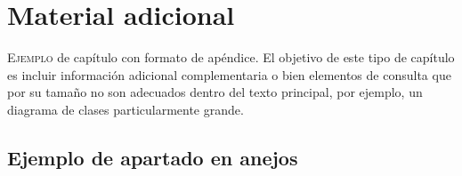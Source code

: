 \chapter{Material adicional}
\label{chap:adicional}

\lettrine{E}{jemplo} de capítulo con formato de apéndice. El objetivo de este tipo de capítulo 
es incluir información adicional complementaria o bien elementos de consulta que por su tamaño no 
son adecuados dentro del texto principal, por ejemplo, un diagrama de clases particularmente grande.

\section{Ejemplo de apartado en anejos}\label{anexo:ejemplo}
\Blindtext

